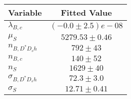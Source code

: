 \begin{tabular}[t]{lc}
\hline
Variable &Fitted Value\\
\hline\hline
$\lambda_{B,c}$&$(-0.0\pm2.5)e-08$\\
\hline
$\mu_S$&$5279.53\pm0.46$\\
\hline
$n_{B, D^* D_s h}$&$792\pm43$\\
\hline
$n_{B,c}$&$140\pm52$\\
\hline
$n_S$&$1629\pm40$\\
\hline
$\sigma_{B, D^* D_s h}$&$72.3\pm3.0$\\
\hline
$\sigma_S$&$12.71\pm0.41$\\
\hline
\end{tabular}